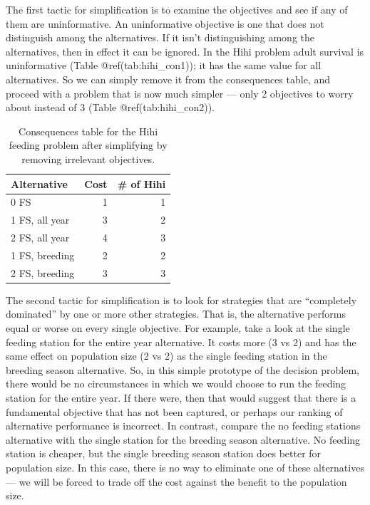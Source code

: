 \documentclass[]{book}
\begin{document}
The first tactic for simplification is to examine the objectives and see
if any of them are uninformative. An uninformative objective is one that
does not distinguish among the alternatives. If it isn't distinguishing
among the alternatives, then in effect it can be ignored. In the Hihi
problem adult survival is uninformative (Table @ref(tab:hihi\_con1)); it
has the same value for all alternatives. So we can simply remove it from
the consequences table, and proceed with a problem that is now much
simpler --- only 2 objectives to worry about instead of 3 (Table
@ref(tab:hihi\_con2)).

\begin{table}[tbp]
\caption{Consequences table for the Hihi feeding problem after simplifying by removing irrelevant objectives.\label{tab:hihi_con2}}
\begin{tabular}{lrr}
\toprule
   \textbf{Alternative}
  &\textbf{Cost}
  &\textbf{\# of Hihi}
\\\midrule
   0 FS           & 1 & 1 
\\ 1 FS, all year & 3 & 2 
\\ 2 FS, all year & 4 & 3 
\\ 1 FS, breeding & 2 & 2 
\\ 2 FS, breeding & 3 & 3 
\\\bottomrule
\end{tabular}
\end{table}

The second tactic for simplification is to look for strategies that are
``completely dominated'' by one or more other strategies. That is, the
alternative performs equal or worse on every single objective. For
example, take a look at the single feeding station for the entire year
alternative. It costs more (3 vs 2) and has the same effect on
population size (2 vs 2) as the single feeding station in the breeding
season alternative. So, in this simple prototype of the decision
problem, there would be no circumstances in which we would choose to run
the feeding station for the entire year. If there were, then that would
suggest that there is a fundamental objective that has not been
captured, or perhaps our ranking of alternative performance is
incorrect. In contrast, compare the no feeding stations alternative with
the single station for the breeding season alternative. No feeding
station is cheaper, but the single breeding season station does better
for population size. In this case, there is no way to eliminate one of
these alternatives --- we will be forced to trade off the cost against
the benefit to the population size.
\end{document}
